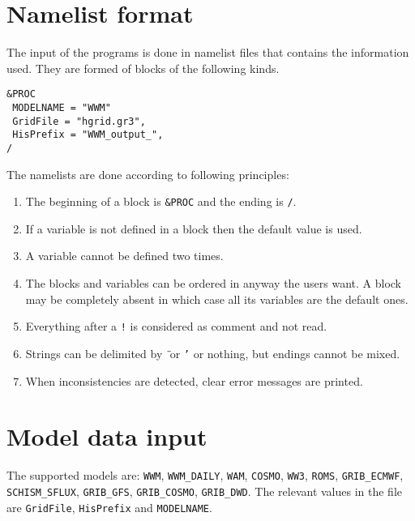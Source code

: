 \documentclass[12pt]{amsart}
\begin{document}
\section{Namelist format}

The input of the programs is done in namelist files that contains the information used.
They are formed of blocks of the following kinds.

\begin{verbatim}
&PROC
 MODELNAME = "WWM"
 GridFile = "hgrid.gr3",
 HisPrefix = "WWM_output_",
/
\end{verbatim}

The namelists are done according to following principles:
\begin{enumerate}
\item The beginning of a block is {\tt \&PROC} and the ending is {\tt /}.
\item If a variable is not defined in a block then the default value is used.
\item A variable cannot be defined two times.
\item The blocks and variables can be ordered in anyway the users want. A block may be completely absent in which case all its variables are the default ones.
\item Everything after a {\tt !} is considered as comment and not read.
\item Strings can be delimited by {\tt {\"{ }}} or {\tt '} or nothing, but endings cannot be mixed.
\item When inconsistencies are detected, clear error messages are printed.
\end{enumerate}









\section{Model data input}

The supported models are: {\tt WWM}, {\tt WWM\_DAILY}, {\tt WAM}, {\tt COSMO}, {\tt WW3}, {\tt ROMS}, {\tt GRIB\_ECMWF}, {\tt SCHISM\_SFLUX}, {\tt GRIB\_GFS}, {\tt GRIB\_COSMO}, {\tt GRIB\_DWD}.
The relevant values in the file are {\tt GridFile}, {\tt HisPrefix} and {\tt MODELNAME}.
\end{document}

